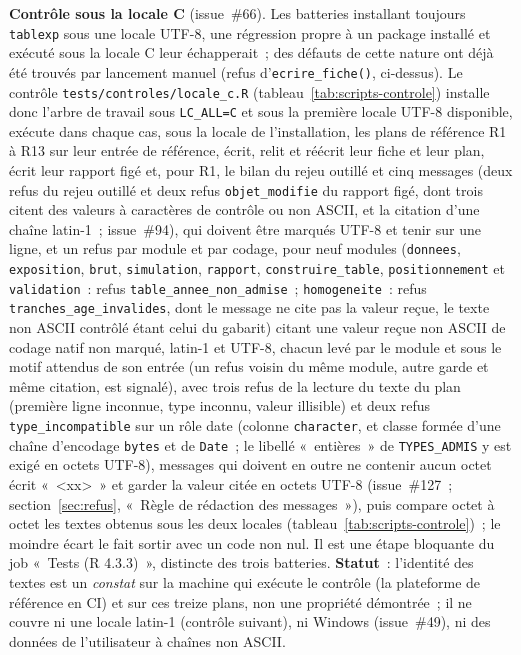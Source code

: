 \documentclass[a4paper,11pt]{article}
\newcommand{\code}[1]{\texttt{\small #1}}
\begin{document}
\medskip
\noindent
\textbf{Contrôle sous la locale C} (issue~\#66). Les batteries installant
toujours \code{tablexp} sous une locale UTF-8, une régression propre à un
package installé et exécuté sous la locale C leur échapperait~; des défauts
de cette nature ont déjà été trouvés par lancement manuel (refus
d'\code{ecrire\_fiche()}, ci-dessus). Le contrôle
\code{tests/controles/locale\_c.R} (tableau~\ref{tab:scripts-controle})
installe donc l'arbre de travail sous \code{LC\_ALL=C} et sous la première
locale UTF-8 disponible, exécute dans chaque cas, sous la locale de
l'installation, les plans de référence R1 à R13 sur leur entrée de référence,
écrit, relit et réécrit leur fiche et leur plan, écrit leur rapport figé et,
pour R1, le bilan du rejeu outillé et cinq messages (deux refus du rejeu
outillé et deux refus \code{objet\_modifie} du rapport figé, dont trois
citent des valeurs à caractères de contrôle ou non ASCII, et la citation
d'une chaîne latin-1~; issue~\#94), qui doivent être marqués UTF-8 et tenir sur une
ligne, et un refus par module et par codage, pour neuf modules
(\code{donnees}, \code{exposition}, \code{brut}, \code{simulation},
\code{rapport}, \code{construire\_table}, \code{positionnement} et
\code{validation}~: refus \code{table\_annee\_non\_admise}~;
\code{homogeneite}~: refus \code{tranches\_age\_invalides}, dont le message
ne cite pas la valeur reçue, le texte non ASCII contrôlé étant celui du
gabarit) citant une valeur reçue non ASCII de
codage natif non marqué, latin-1 et UTF-8, chacun levé par le module et
sous le motif attendus de son entrée (un refus voisin du même module,
autre garde et même citation, est signalé), avec trois refus de la
lecture du texte du plan (première ligne inconnue, type inconnu, valeur
illisible) et deux refus \code{type\_incompatible} sur un rôle date
(colonne \code{character}, et classe formée d'une chaîne d'encodage
\code{bytes} et de \code{Date}~; le libellé «~entières~» de
\code{TYPES\_ADMIS} y est exigé en octets UTF-8), messages qui doivent en outre ne contenir aucun octet écrit
«~<xx>~» et garder la valeur citée en octets UTF-8 (issue~\#127~;
section~\ref{sec:refus}, «~Règle de rédaction des messages~»), puis
compare octet à octet les textes
obtenus sous les deux locales (tableau~\ref{tab:scripts-controle})~; le
moindre écart le fait sortir avec un code non nul. Il est une étape bloquante
du job «~Tests (R 4.3.3)~», distincte des trois batteries. \textbf{Statut}~:
l'identité des textes est un \emph{constat} sur la machine qui exécute le
contrôle (la plateforme de référence en CI) et sur ces treize plans, non une
propriété démontrée~; il ne couvre ni une locale latin-1 (contrôle
suivant), ni Windows (issue~\#49), ni des données de l'utilisateur à chaînes
non ASCII.
\end{document}
